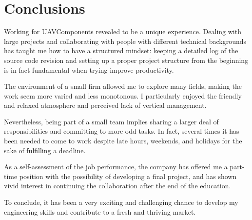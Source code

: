 \section{Conclusions}
Working for UAVComponents revealed to be a unique experience.
Dealing with large projects and collaborating with people with different technical backgrounds has taught me how to have a structured mindset: keeping a detailed log of the source code revision and setting up a proper project structure from the beginning is in fact fundamental when trying improve productivity.

The environment of a small firm allowed me to explore many fields, making the work seem more varied and less monotonous.
I particularly enjoyed the friendly and relaxed atmosphere and perceived lack of vertical management.

Nevertheless, being part of a small team implies sharing a larger deal of responsibilities and committing to more odd tasks.
In fact, several times it has been needed to come to work despite late hours, weekends, and holidays for the sake of fulfilling a deadline.

As a self-assessment of the job performance, the company has offered me a part-time position with the possibility of developing a final project, and has shown vivid interest in continuing the collaboration after the end of the education.

To conclude, it has been a very exciting and challenging chance to develop my engineering skills and contribute to a fresh and thriving market.
